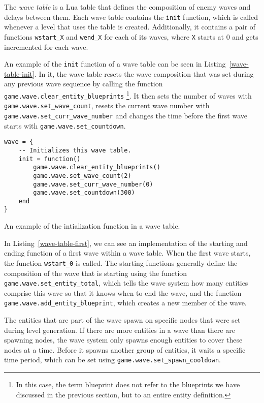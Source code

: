 The \emph{wave table} is a Lua table that defines the composition of enemy waves and delays between them. Each wave table contains the
\texttt{init} function, which is called whenever a level that uses the table is created. Additionally, it contains a pair of functions
\texttt{wstart\_X} and \texttt{wend\_X} for each of its waves, where \texttt{X} starts at 0 and gets incremented for each wave.

An example of the \texttt{init} function of a wave table can be seen in Listing~\ref{wave-table-init}. In it, the wave table resets the wave
composition that was set during any previous wave sequence by calling the function \texttt{game.wave.clear\_entity\_blueprints}
\footnote{In this case, the term blueprint does not refer to the blueprints we have discussed in the previous section, but to an
entire entity definition.}. It then sets the number of waves with \texttt{game.wave.set\_wave\_count}, resets the current wave number with
\texttt{game.wave.set\_curr\_wave\_number} and changes the time before the first wave starts with \texttt{game.wave.set\_countdown}.

\begin{listing}[H]
    \centering
    \begin{lstlisting}
wave = {
    -- Initializes this wave table.
    init = function()
        game.wave.clear_entity_blueprints()
        game.wave.set_wave_count(2)
        game.wave.set_curr_wave_number(0)
        game.wave.set_countdown(300)
    end
}
    \end{lstlisting}
    \caption{An example of the intialization function in a wave table.}
    \label{wave-table-init}
\end{listing}

In Listing~\ref{wave-table-first}, we can see an implementation of the starting and ending function of a first wave within a wave table.
When the first wave starts, the function \texttt{wstart\_0} is called. The starting functions generally define the composition
of the wave that is starting using the function \texttt{game.wave.set\_entity\_total}, which tells the wave system how many entities
comprise this wave so that it knows when to end the wave, and the function \texttt{game.wave.add\_entity\_blueprint}, which creates a new
member of the wave.

The entities that are part of the wave spawn on specific nodes that were set during level generation. If there are more entities in a wave
than there are spawning nodes, the wave system only spawns enough entities to cover these nodes at a time. Before it spawns another
group of entities, it waits a specific time period, which can be set using \texttt{game.wave.set\_spawn\_cooldown}.

